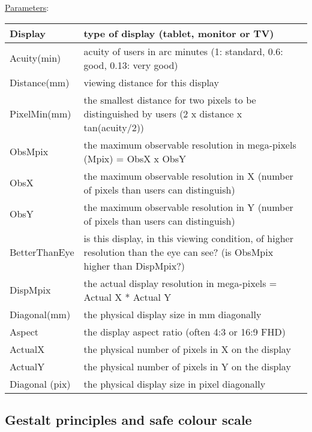 \documentclass[11pt]{article}
\begin{document}
\underline{Parameters}:
\begin{table}[h!]
    \centering
    \begin{tabular}{|l|m{10cm}|}
        \hline
        Display & type of display (tablet, monitor or TV) \\
        \hline
        Acuity(min) & acuity of users in arc minutes (1: standard, 0.6: good, 0.13: very good) \\
        \hline
        Distance(mm) & viewing distance for this display \\
        \hline
        PixelMin(mm) & the smallest distance for two pixels to be distinguished by users (2 x distance x tan(acuity/2)) \\
        \hline
        ObsMpix & the maximum observable resolution in mega-pixels (Mpix) = ObsX x ObsY \\
        \hline
        ObsX & the maximum observable resolution in X (number of pixels than users can distinguish) \\
        \hline
        ObsY & the maximum observable resolution in Y (number of pixels than users can distinguish) \\
        \hline
        BetterThanEye & is this display, in this viewing condition, of higher resolution than the eye can see? (is ObsMpix higher than DispMpix?)\\
        \hline
        DispMpix & the actual display resolution in mega-pixels = Actual X * Actual Y \\
        \hline
        Diagonal(mm) & the physical display size in mm diagonally \\
        \hline
        Aspect & the display aspect ratio (often 4:3 or 16:9 FHD)  \\
        \hline
        ActualX & the physical number of pixels in X on the display \\
        \hline
        ActualY & the physical number of pixels in Y on the display \\
        \hline
        Diagonal (pix) & the physical display size in pixel diagonally \\
        \hline
    \end{tabular}
\end{table}

\subsection{Gestalt principles and safe colour scale}
\end{document}
